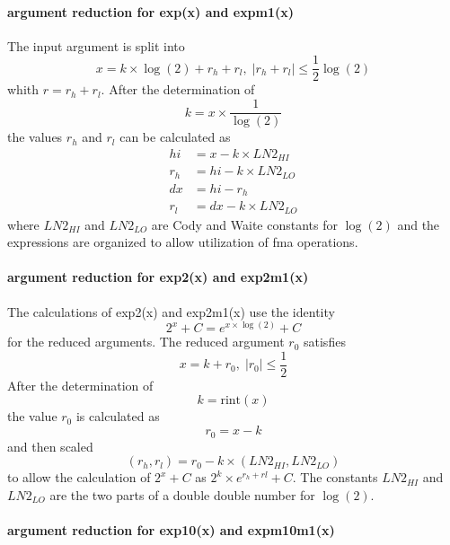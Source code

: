 \documentclass[10pt,a4paper,final,oneside]{article}
\numberwithin{equation}{subsection}
\begin{document}
\paragraph{argument reduction for exp(x) and expm1(x)}

The input argument is split into
\begin{equation}
  x = k \times \log{(2)} + r_h + r_l, \;
  |r_h +r_l| \le \frac{1}{2} \log{(2)}
\end{equation}
whith $r = r_h + r_l$.
After the determination of
\[
k = x \times \frac{1}{\log{(2)}}
\]
the values $r_h$ and $r_l$ can be calculated as
\[
\begin{aligned}
  hi &= x - k \times LN2_{HI} \\
  r_h &= hi - k \times LN2_{LO} \\
  dx & = hi - r_h \\
  r_l &= dx - k \times LN2_{LO}
\end{aligned}
\]
where $LN2_{HI}$ and $LN2_{LO}$ are Cody and Waite constants for $\log(2)$
and the expressions are organized to allow utilization of fma operations.

\paragraph{argument reduction for exp2(x) and exp2m1(x)}

The calculations of exp2(x) and exp2m1(x) use the
identity
\begin{equation}
  2^x + C = e^{x \times \log{(2)}} + C
\end{equation}
for the reduced arguments.
The reduced argument $ r_0 $ satisfies
\begin{equation}
  x = k + r_0, \;
  |r_0| \le \frac{1}{2}
\end{equation}
After the determination of
\[
k = \text{rint}(x)
\]
the value $r_0$ is calculated as
\[
r_0 = x - k
\]
and then scaled
\[
(r_h, r_l) = r_0 - k \times (LN2_{HI}, LN2_{LO})
\]
to allow the calculation of $ 2^x + C $ as $ 2^k \times e^{r_h+ rl} + C$.
The constants $LN2_{HI}$ and $LN2_{LO}$ are the two parts of a double double number for $\log{(2)}$.

\paragraph{argument reduction for exp10(x) and expm10m1(x)}
\end{document}
